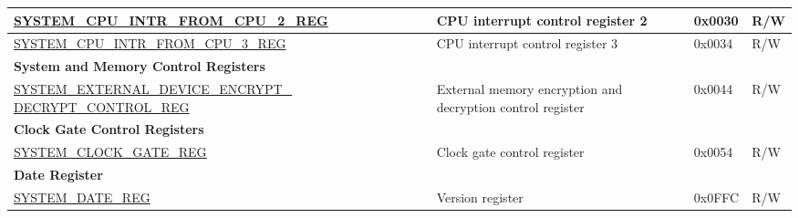 \begin{longtable}{ | p{6.5cm} | p{6.5cm} | p{1.3cm} | p{1cm} | }
\hyperref[regdesc:SYSTEMCPUINTRFROMCPU2REG]{SYSTEM\_CPU\_INTR\_FROM\_CPU\_2\_REG} & CPU interrupt control register 2 & 0x0030 & R/W \\ \hline
\hyperref[regdesc:SYSTEMCPUINTRFROMCPU3REG]{SYSTEM\_CPU\_INTR\_FROM\_CPU\_3\_REG} & CPU interrupt control register 3 & 0x0034 & R/W \\ \hline
\multicolumn{4}{|l|}{\textbf{System and Memory Control Registers}} \\ \hline
\hyperref[regdesc:SYSTEMEXTERNALDEVICEENCRYPTDECRYPTCONTROLREG]{SYSTEM\_EXTERNAL\_DEVICE\_ENCRYPT\_} \hyperref[regdesc:SYSTEMEXTERNALDEVICEENCRYPTDECRYPTCONTROLREG]{DECRYPT\_CONTROL\_REG} & External memory encryption and decryption control register & 0x0044 & R/W \\ \hline
\multicolumn{4}{|l|}{\textbf{Clock Gate Control Registers}} \\ \hline
\hyperref[regdesc:SYSTEMCLOCKGATEREG]{SYSTEM\_CLOCK\_GATE\_REG} & Clock gate control register & 0x0054 & R/W \\ \hline
\multicolumn{4}{|l|}{\textbf{Date Register}} \\ \hline
\hyperref[regdesc:SYSTEMDATEREG]{SYSTEM\_DATE\_REG} & Version register & 0x0FFC & R/W \\ \hline
\end{longtable}
